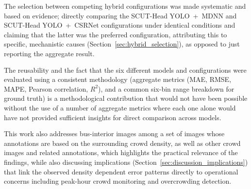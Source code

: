 The selection between competing hybrid configurations was made systematic and based on evidence; directly comparing the SCUT-Head YOLO~+~MDNN and SCUT-Head YOLO~+~CSRNet configurations under identical conditions and claiming that the latter was the preferred configuration, attributing this to specific, mechanistic causes (Section~\ref{sec:hybrid_selection}), as opposed to just reporting the aggregate result.

The reusability and the fact that the six different models and configurations were evaluated using a consistent methodology (aggregate metrics (MAE, RMSE, MAPE, Pearson correlation, $R^2$), and a common six-bin range breakdown for ground truth) is a methodological contribution that would not have been possible without the use of a number of aggregate metrics where each one alone would have not provided sufficient insights for direct comparison across models.

This work also addresses bus-interior images among a set of images whose annotations are based on the surrounding crowd density, as well as other crowd images and related annotations, which highlights the practical relevance of the findings, while also discussing implications (Section~\ref{sec:discussion_implications}) that link the observed density dependent error patterns directly to operational concerns including peak-hour crowd monitoring and overcrowding detection.



